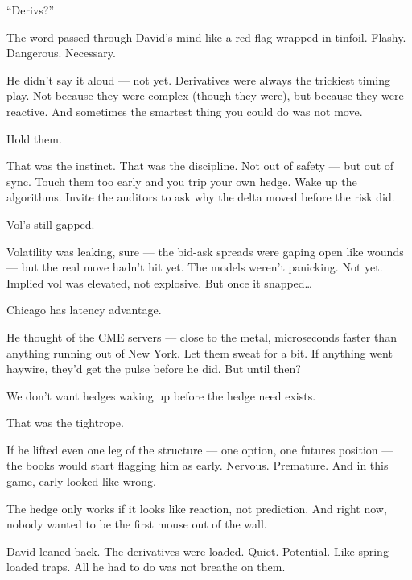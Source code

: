 \medskip


“Derivs?”

The word passed through David’s mind like a red flag wrapped in tinfoil. Flashy. Dangerous. Necessary.

He didn’t say it aloud — not yet. Derivatives were always the trickiest timing play. Not because they were complex (though they were), but because they were reactive. And sometimes the smartest thing you could do was not move.

Hold them.

That was the instinct. That was the discipline. Not out of safety — but out of sync. Touch them too early and you trip your own hedge. Wake up the algorithms. Invite the auditors to ask why the delta moved before the risk did.

Vol’s still gapped.

Volatility was leaking, sure — the bid-ask spreads were gaping open like wounds — but the real move hadn’t hit yet. The models weren’t panicking. Not yet. Implied vol was elevated, not explosive. But once it snapped…

Chicago has latency advantage.

He thought of the CME servers — close to the metal, microseconds faster than anything running out of New York. Let them sweat for a bit. If anything went haywire, they’d get the pulse before he did. But until then?

We don’t want hedges waking up before the hedge need exists.

That was the tightrope.

If he lifted even one leg of the structure — one option, one futures position — the books would start flagging him as early. Nervous. Premature. And in this game, early looked like wrong.

The hedge only works if it looks like reaction, not prediction. And right now, nobody wanted to be the first mouse out of the wall.

David leaned back. The derivatives were loaded. Quiet. Potential. Like spring-loaded traps. All he had to do was not breathe on them.

\medskip

